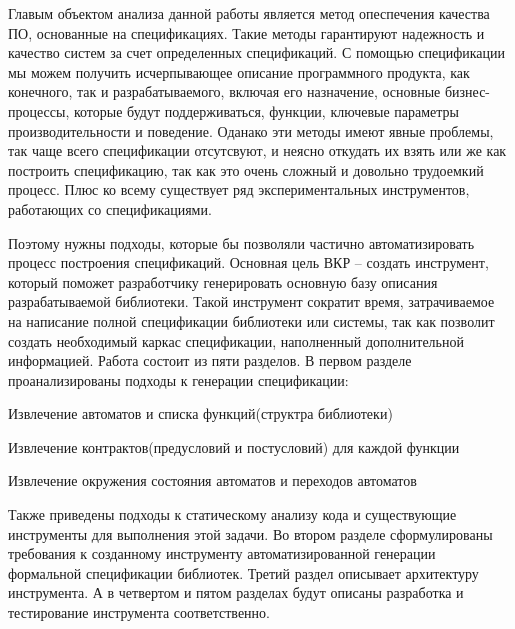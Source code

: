 Главым объектом анализа данной работы является метод опеспечения качества ПО, основанные на спецификациях.
Такие методы гарантируют надежность и качество систем за счет определенных спецификаций.
С помощью спецификации мы можем получить исчерпывающее описание программного продукта, как конечного, так и разрабатываемого, включая его назначение, основные бизнес-процессы, которые будут поддерживаться, функции, ключевые параметры производительности и поведение.
Оданако эти методы имеют явные проблемы, так чаще всего спецификации отсутсвуют, и неясно откудать их взять или же как построить спецификацию, так как это очень сложный и довольно трудоемкий процесс.
Плюс ко всему существует ряд экспериментальных инструментов, работающих со спецификациями.

Поэтому нужны подходы, которые бы позволяли частично автоматизировать процесс построения спецификаций.
Основная цель ВКР – создать инструмент, который поможет разработчику генерировать основную базу описания разрабатываемой библиотеки. Такой инструмент сократит время, затрачиваемое на написание полной спецификации библиотеки или системы, так как позволит создать необходимый каркас спецификации, наполненный дополнительной информацией.
Работа состоит из пяти разделов. В первом разделе проанализированы подходы к генерации спецификации:
%
\begin{itemize*}
\item Извлечение автоматов и списка функций(структра библиотеки)
\item Извлечение контрактов(предусловий и постусловий) для каждой функции
\item Извлечение окружения состояния автоматов и переходов автоматов
\end{itemize*}
%
Также приведены подходы к статическому анализу кода и существующие инструменты для выполнения этой задачи. Во втором разделе сформулированы требования к созданному инструменту автоматизированной генерации формальной спецификации библиотек. Третий раздел описывает архитектуру инструмента. А в четвертом и пятом разделах будут описаны разработка и тестирование инструмента соответственно.
